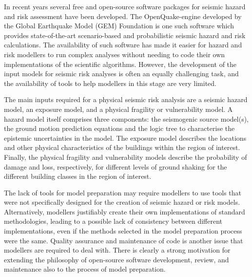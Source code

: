 In recent years several free and open-source software packages for seismic hazard and risk assessment have been developed. The OpenQuake-engine developed by the Global Earthquake Model (GEM) Foundation \citep{PaganiEtAl2014a} is one such software which provides state-of-the-art scenario-based and probabilistic seismic hazard and risk calculations. The availability of such software has made it easier for hazard and risk modellers to run complex analyses without needing to code their own implementations of the scientific algorithms. However, the development of the input models for seismic risk analyses is often an equally challenging task, and the availability of tools to help modellers in this stage are very limited.

The main inputs required for a physical seismic risk analysis are a seismic hazard model, an exposure model, and a physical fragility or vulnerability model. A hazard model itself comprises three components: the seismogenic source model(s), the ground motion prediction equations and the logic tree to characterise the epistemic uncertainties in the model. The exposure model describes the locations and other physical characteristics of the buildings within the region of interest. Finally, the physical fragility and vulnerability models describe the probability of damage and loss, respectively, for different levels of ground shaking for the different building classes in the region of interest.

The lack of tools for model preparation may require modellers to use tools that were not specifically designed for the creation of seismic hazard or risk models. Alternatively, modellers justifiably create their own implementations of standard methodologies, leading to a possible lack of consistency between different implementations, even if the methods selected in the model preparation process were the same. Quality assurance and maintenance of code is another issue that modellers are required to deal with. There is clearly a strong motivation for extending the philosophy of open-source software development, review, and maintenance also to the process of model preparation.

